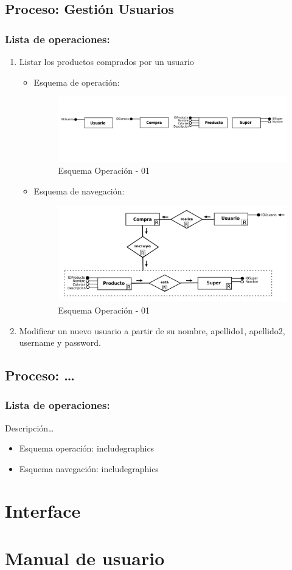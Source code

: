 \documentclass[a4paper,12pt]{report}
\begin{document}
\section{Proceso: Gestión Usuarios}
\label{sec-7-1}
\subsection{Lista de operaciones:}
\label{sec-7-1-1}
\begin{enumerate}
\item Listar los productos comprados por un usuario
\begin{itemize}
\item Esquema de operación:
\begin{figure}[!htp]
\centering
\includegraphics[width=0.9\linewidth]{./operaciones/img/ope01.png}
\caption{Esquema Operación - 01}
\label{fig:ope01}
\medskip
\footnotesize
{}
\end{figure}
\item Esquema de navegación:
\begin{figure}[!htp]
\centering
\includegraphics[width=0.9\linewidth]{./operaciones/img/nave01.png}
\caption{Esquema Operación - 01}
\label{fig:ope01}
\medskip
\footnotesize
{}
\end{figure}
\end{itemize}
\item Modificar un nuevo usuario a partir de su nombre, apellido1,
apellido2, username y password.
\end{enumerate}

\section{Proceso: \ldots{}}
\label{sec-7-2}
\subsection{Lista de operaciones:}
\label{sec-7-2-1}
Descripción\ldots{}
\begin{itemize}
\item Esquema operación:
includegraphics
\item Esquema navegación:
includegraphics
\end{itemize}
\chapter{Interface}
\label{sec-8}

\chapter{Manual de usuario}
\label{sec-9}
\end{document}
